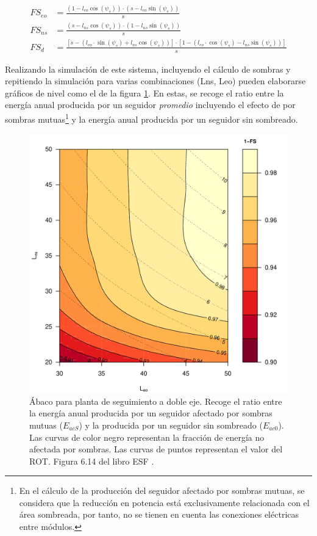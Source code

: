 \begin{align}
FS_{eo} & =\frac{(1-l_{eo}\cos(\psi_{s}))\cdot(s-l_{eo}\sin(\psi_{s}))}{s}\\
FS_{ns} & =\frac{(s-l_{ns}\cos(\psi_{s}))\cdot(1-l_{ns}\sin(\psi_{s}))}{s}\\
FS_{d} & =\frac{\left[s-\left(l_{eo}\cdot\sin(\psi_{s})+l_{ns}\cos(\psi_{s})\right)\right]\cdot\left[1-\left(l_{eo}\cdot\cos(\psi_{s})-l_{ns}\sin(\psi_{s})\right)\right]}{s}
\end{align}

Realizando la simulación de este sistema, incluyendo el cálculo de sombras y repitiendo la simulación para varias combinaciones (Lns, Leo) pueden elaborarse gráficos de nivel como el de la figura \ref{fig:abaco-sombras}. En estas, se recoge el ratio entre la energía anual producida por un seguidor \emph{promedio} incluyendo el efecto de por sombras mutuas\footnote{En el cálculo de la producción del seguidor afectado por sombras mutuas, se considera que la reducción en potencia está exclusivamente relacionada con el área sombreada, por tanto, no se tienen en cuenta las conexiones eléctricas entre módulos.} y la energía anual producida por un seguidor sin sombreado.
\begin{figure}[htbp]
\centering
\includegraphics[height=0.4\textheight]{figuras/AbacoSombras.pdf}
\caption{Ábaco para planta de seguimiento a doble eje. Recoge el ratio entre la energía anual producida por un seguidor afectado por sombras mutuas (\(E_{acS}\)) y la producida por un seguidor sin sombreado (\(E_{ac0}\)). Las curvas de color negro representan la fracción de energía no afectada por sombras. Las curvas de puntos representan el valor del ROT. Figura 6.14 del libro ESF \cite{Perpinan2023}. \label{fig:abaco-sombras}}
\end{figure}

